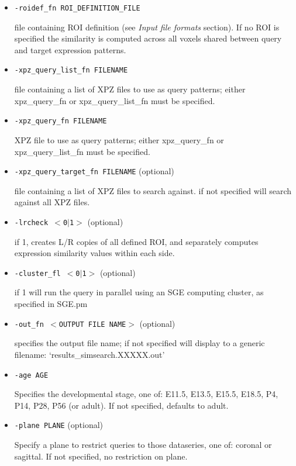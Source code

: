 \documentclass[10pt]{article}
\begin{document}
\begin{itemize}
\item {\tt -roidef\_fn ROI\_DEFINITION\_FILE}

file containing ROI definition (see {\it Input file formats} section). If no ROI is specified the similarity is computed across all voxels shared between query and target expression patterns.

\item {\tt -xpz\_query\_list\_fn FILENAME}

file containing a list of XPZ files to use as query patterns; either xpz\_query\_fn or xpz\_query\_list\_fn must be specified.

\item {\tt -xpz\_query\_fn FILENAME}

XPZ file to use as query patterns; either xpz\_query\_fn or xpz\_query\_list\_fn must be specified.

\item {\tt -xpz\_query\_target\_fn FILENAME} (optional)

file containing a list of XPZ files to search against. if not specified will search against all XPZ files.

\item {\tt -lrcheck $<$0$|$1$>$} (optional)

if 1, creates L/R copies of all defined ROI, and separately computes expression similarity values within each side.

\item {\tt -cluster\_fl $<$0$|$1$>$} (optional)

if 1 will run the query in parallel using an SGE computing cluster, as specified in SGE.pm

\item {\tt -out\_fn $<$OUTPUT FILE NAME$>$} (optional)

specifies the output file name; if not specified will display to a generic filename: `results\_simsearch.XXXXX.out'

\item {\tt -age AGE}

Specifies the developmental stage, one of: E11.5, E13.5, E15.5, E18.5, P4, P14, P28, P56 (or adult). If not specified, defaults to adult.

\item {\tt -plane PLANE} (optional)

Specify a plane to restrict queries to those dataseries, one of: coronal or sagittal. If not specified, no restriction on plane.

\end{itemize}
\end{document}
